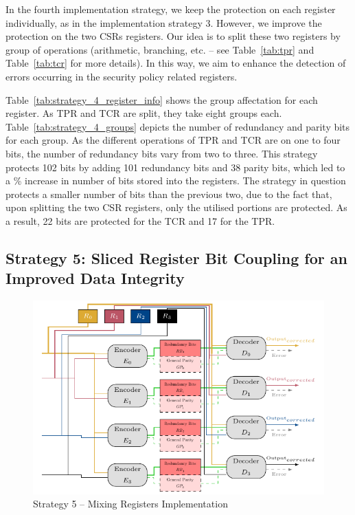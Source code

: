 In the fourth implementation strategy, we keep the protection on each register individually, as in the implementation strategy 3. However, we improve the protection on the two CSRs registers. Our idea is to split these two registers by group of operations (arithmetic, branching, etc. -- see Table~\ref{tab:tpr} and Table~\ref{tab:tcr} for more details). In this way, we aim to enhance the detection of errors occurring in the security policy related registers.

Table~\ref{tab:strategy_4_register_info} shows the group affectation for each register. As TPR and TCR are split, they take eight groups each.
Table~\ref{tab:strategy_4_groups} depicts the number of redundancy and parity bits for each group. As the different operations of TPR and TCR are on one to four bits, the number of redundancy bits vary from two to three. This strategy protects 102 bits by adding 101 redundancy bits and 38 parity bits, which led to a \% increase in number of bits stored into the registers. The strategy in question protects a smaller number of bits than the previous two, due to the fact that, upon splitting the two CSR registers, only the utilised portions are protected. As a result, 22 bits are protected for the TCR and 17 for the TPR.

\subsection{Strategy 5: Sliced Register Bit Coupling for an Improved Data Integrity}

\begin{figure}[ht]
    \centering
    \includegraphics[page=1]{c6_group_composition/img/implem5_spaghetti.pdf}
    \caption{Strategy 5 -- Mixing Registers Implementation}
    \label{fig:strategy_5_functionning}
\end{figure}

